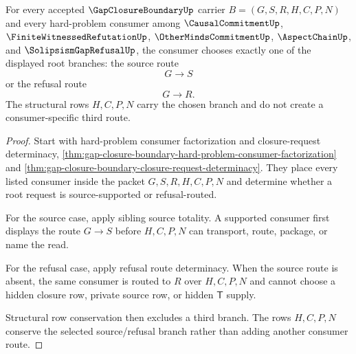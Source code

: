 \begin{theorem}
\label{thm:gap-closure-boundary-downstream-branch-determinacy}
For every accepted $\GapClosureBoundaryUp$ carrier $B=(G,S,R,H,C,P,N)$ and every hard-problem consumer among $\CausalCommitmentUp$, $\FiniteWitnessedRefutationUp$, $\OtherMindsCommitmentUp$, $\AspectChainUp$, and $\SolipsismGapRefusalUp$, the consumer chooses exactly one of the displayed root branches: the source route
$$
G \longrightarrow S
$$
or the refusal route
$$
G \longrightarrow R.
$$
The structural rows $H,C,P,N$ carry the chosen branch and do not create a consumer-specific third route.
\end{theorem}
\begin{proof}
Start with hard-problem consumer factorization and closure-request determinacy, \autoref{thm:gap-closure-boundary-hard-problem-consumer-factorization} and \autoref{thm:gap-closure-boundary-closure-request-determinacy}. They place every listed consumer inside the packet $G,S,R,H,C,P,N$ and determine whether a root request is source-supported or refusal-routed.

For the source case, apply sibling source totality. A supported consumer first displays the route $G \longrightarrow S$ before $H,C,P,N$ can transport, route, package, or name the read.

For the refusal case, apply refusal route determinacy. When the source route is absent, the same consumer is routed to $R$ over $H,C,P,N$ and cannot choose a hidden closure row, private source row, or hidden $\mathsf{T}$ supply.

Structural row conservation then excludes a third branch. The rows $H,C,P,N$ conserve the selected source/refusal branch rather than adding another consumer route.
\end{proof}

